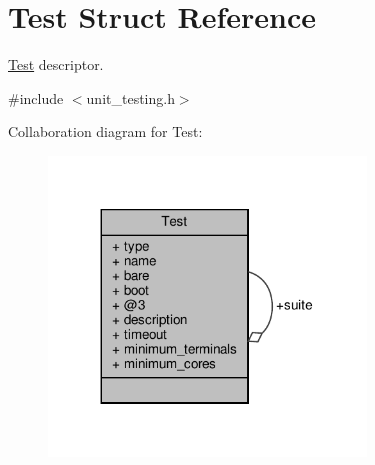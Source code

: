 \hypertarget{structTest}{}\section{Test Struct Reference}
\label{structTest}


\hyperlink{structTest}{Test} descriptor.  




{\ttfamily \#include $<$unit\+\_\+testing.\+h$>$}



Collaboration diagram for Test\+:\nopagebreak
\begin{figure}[H]
\begin{center}
\leavevmode
\includegraphics[width=239pt]{structTest__coll__graph}
\end{center}
\end{figure}
